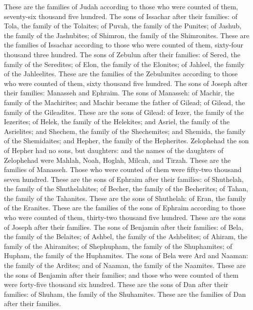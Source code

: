 {These are the families of Judah according to those who were counted of them, seventy-six thousand five hundred.
The sons of Issachar after their families: of Tola, the family of the Tolaites; of Puvah, the family of the Punites;
of Jashub, the family of the Jashubites; of Shimron, the family of the Shimronites.
These are the families of Issachar according to those who were counted of them, sixty-four thousand three hundred.
The sons of Zebulun after their families: of Sered, the family of the Seredites; of Elon, the family of the Elonites; of Jahleel, the family of the Jahleelites.
These are the families of the Zebulunites according to those who were counted of them, sixty thousand five hundred.
The sons of Joseph after their families: Manasseh and Ephraim.
The sons of Manasseh: of Machir, the family of the Machirites; and Machir became the father of Gilead; of Gilead, the family of the Gileadites.
These are the sons of Gilead: of Iezer, the family of the Iezerites; of Helek, the family of the Helekites;
and Asriel, the family of the Asrielites; and Shechem, the family of the Shechemites;
and Shemida, the family of the Shemidaites; and Hepher, the family of the Hepherites.
Zelophehad the son of Hepher had no sons, but daughters: and the names of the daughters of Zelophehad were Mahlah, Noah, Hoglah, Milcah, and Tirzah.
These are the families of Manasseh. Those who were counted of them were fifty-two thousand seven hundred.
These are the sons of Ephraim after their families: of Shuthelah, the family of the Shuthelahites; of Becher, the family of the Becherites; of Tahan, the family of the Tahanites.
These are the sons of Shuthelah: of Eran, the family of the Eranites.
These are the families of the sons of Ephraim according to those who were counted of them, thirty-two thousand five hundred. These are the sons of Joseph after their families.
The sons of Benjamin after their families: of Bela, the family of the Belaites; of Ashbel, the family of the Ashbelites; of Ahiram, the family of the Ahiramites;
of Shephupham, the family of the Shuphamites; of Hupham, the family of the Huphamites.
The sons of Bela were Ard and Naaman: the family of the Ardites; and of Naaman, the family of the Naamites.
These are the sons of Benjamin after their families; and those who were counted of them were forty-five thousand six hundred.
These are the sons of Dan after their families: of Shuham, the family of the Shuhamites. These are the families of Dan after their families.
}
